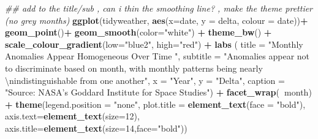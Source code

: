 \documentclass[
]{article}
\newenvironment{Shaded}{\begin{snugshade}}{\end{snugshade}}
\newcommand{\CharTok}[1]{\textcolor[rgb]{0.31,0.60,0.02}{#1}}
\newcommand{\CommentTok}[1]{\textcolor[rgb]{0.56,0.35,0.01}{\textit{#1}}}
\newcommand{\DataTypeTok}[1]{\textcolor[rgb]{0.13,0.29,0.53}{#1}}
\newcommand{\DecValTok}[1]{\textcolor[rgb]{0.00,0.00,0.81}{#1}}
\newcommand{\KeywordTok}[1]{\textcolor[rgb]{0.13,0.29,0.53}{\textbf{#1}}}
\newcommand{\NormalTok}[1]{#1}
\newcommand{\OperatorTok}[1]{\textcolor[rgb]{0.81,0.36,0.00}{\textbf{#1}}}
\newcommand{\StringTok}[1]{\textcolor[rgb]{0.31,0.60,0.02}{#1}}
\begin{document}
\begin{Shaded}
\begin{Highlighting}[]
\CommentTok{## add to the title/sub , can i thin the smoothing line? , make the theme prettier (no grey months)}
\KeywordTok{ggplot}\NormalTok{(tidyweather, }\KeywordTok{aes}\NormalTok{(}\DataTypeTok{x=}\NormalTok{date, }\DataTypeTok{y =}\NormalTok{ delta, }\DataTypeTok{colour =}\NormalTok{ date))}\OperatorTok{+}
\StringTok{  }\KeywordTok{geom_point}\NormalTok{()}\OperatorTok{+}
\StringTok{  }\KeywordTok{geom_smooth}\NormalTok{(}\DataTypeTok{color=}\StringTok{"white"}\NormalTok{) }\OperatorTok{+}
\StringTok{  }\KeywordTok{theme_bw}\NormalTok{() }\OperatorTok{+}
\StringTok{  }\KeywordTok{scale_colour_gradient}\NormalTok{(}\DataTypeTok{low=}\StringTok{"blue2"}\NormalTok{, }\DataTypeTok{high=}\StringTok{"red"}\NormalTok{) }\OperatorTok{+}
\StringTok{  }\KeywordTok{labs}\NormalTok{ (}
    \DataTypeTok{title =} \StringTok{"Monthly Anomalies Appear Homogeneous Over Time "}\NormalTok{, }
  \DataTypeTok{subtitle =} \StringTok{"Anomalies appear not to discriminate based on month, with monthly patterns being nearly }\CharTok{\textbackslash{}n}\StringTok{indistinguishable from one another"}\NormalTok{, }\DataTypeTok{x =} \StringTok{"Year"}\NormalTok{, }\DataTypeTok{y =} \StringTok{"Delta"}\NormalTok{, }\DataTypeTok{caption =} \StringTok{"Source: NASA's Goddard Institute for Space Studies"}\NormalTok{) }\OperatorTok{+}
\StringTok{  }\KeywordTok{facet_wrap}\NormalTok{(}\OperatorTok{~}\NormalTok{month) }\OperatorTok{+}\StringTok{ }
\StringTok{  }\KeywordTok{theme}\NormalTok{(}\DataTypeTok{legend.position =} \StringTok{"none"}\NormalTok{, }\DataTypeTok{plot.title =} \KeywordTok{element_text}\NormalTok{(}\DataTypeTok{face =} \StringTok{"bold"}\NormalTok{), }\DataTypeTok{axis.text=}\KeywordTok{element_text}\NormalTok{(}\DataTypeTok{size=}\DecValTok{12}\NormalTok{),}
        \DataTypeTok{axis.title=}\KeywordTok{element_text}\NormalTok{(}\DataTypeTok{size=}\DecValTok{14}\NormalTok{,}\DataTypeTok{face=}\StringTok{"bold"}\NormalTok{))}
\end{Highlighting}
\end{Shaded}
\end{document}
